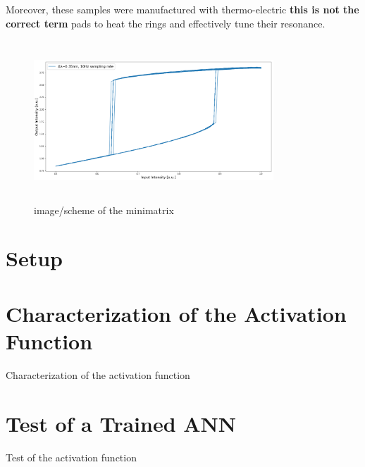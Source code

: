 Moreover, these samples were manufactured with thermo-electric \large\textbf{this is not the correct term} \normalsize pads to heat the rings and effectively tune their resonance.

\begin{figure}[ht]
	\centering
	\includegraphics[draft,width=9cm,height=6cm]{figures/foo.png}
	\caption{image/scheme of the minimatrix}
	\label{fig:minimatrix_full}
\end{figure}

\section{Setup}

\section{Characterization of the Activation Function}
\label{sec:Characterization_of_the_Activation_Function}
Characterization of the activation function

\section{Test of a Trained ANN}
\label{sec:Test_of_a_Trained ANN}
Test of the activation function